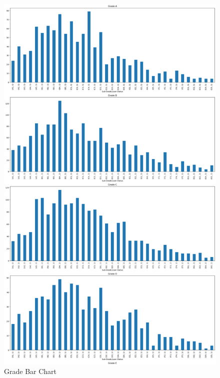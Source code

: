 \documentclass[sigplan]{acmart}
\begin{document}
\begin{figure}
    \centering
    \includegraphics[width=\linewidth, height=\textheight]{images/grade-subgrade vs loan status-1.png}
    \caption{Grade Bar Chart}
\end{figure}
\end{document}
